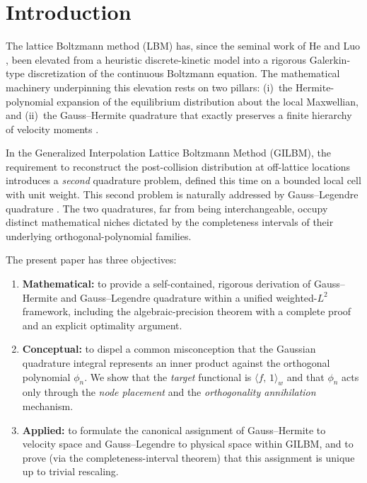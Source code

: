 \documentclass[11pt,a4paper]{article}
\theoremstyle{definition}
\newcommand{\ipw}[2]{\langle #1,\, #2 \rangle_{w}}
\begin{document}
\section{Introduction}\label{sec:intro}

The lattice Boltzmann method (LBM) has, since the seminal work of He and Luo
\cite{HeLuo1997a}, been elevated from a heuristic discrete-kinetic model into a
rigorous Galerkin-type discretization of the continuous Boltzmann equation. The
mathematical machinery underpinning this elevation rests on two pillars:
(i)~the Hermite-polynomial expansion of the equilibrium distribution about the
local Maxwellian, and (ii)~the Gauss--Hermite quadrature that exactly preserves
a finite hierarchy of velocity moments
\cite{ShanHe1998,Philippi2006,ShanYuanChen2006}.

In the Generalized Interpolation Lattice Boltzmann Method (GILBM), the
requirement to reconstruct the post-collision distribution at off-lattice
locations introduces a \emph{second} quadrature problem, defined this time on a
bounded local cell with unit weight. This second problem is naturally
addressed by Gauss--Legendre quadrature
\cite{HeLuoDembo1996,Kruger2017,Succi2018}. The two quadratures, far from being
interchangeable, occupy distinct mathematical niches dictated by the
completeness intervals of their underlying orthogonal-polynomial families.

The present paper has three objectives:
\begin{enumerate}
  \item[(i)] \textbf{Mathematical:} to provide a self-contained, rigorous
        derivation of Gauss--Hermite and Gauss--Legendre quadrature within a
        unified weighted-$L^2$ framework, including the algebraic-precision
        theorem with a complete proof and an explicit optimality argument.
  \item[(ii)] \textbf{Conceptual:} to dispel a common misconception that the
        Gaussian quadrature integral represents an inner product against the
        orthogonal polynomial $\phi_n$. We show that the \emph{target}
        functional is $\ipw{f}{1}$ and that $\phi_n$ acts only through the
        \emph{node placement} and the \emph{orthogonality annihilation}
        mechanism.
  \item[(iii)] \textbf{Applied:} to formulate the canonical assignment of
        Gauss--Hermite to velocity space and Gauss--Legendre to physical space
        within GILBM, and to prove (via the completeness-interval theorem) that
        this assignment is unique up to trivial rescaling.
\end{enumerate}
\end{document}
